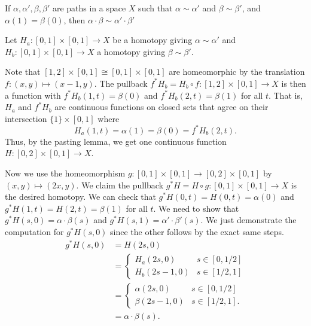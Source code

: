 \documentclass[12 pt, letterpaper]{hmcpset}
\begin{document}
\pagebreak

\begin{problem}[12.5]
	If $\alpha, \alpha', \beta, \beta'$ are paths in a space $X$ such that $\alpha \sim \alpha'$ and $\beta \sim \beta'$, and $\alpha(1) = \beta(0)$, then $\alpha \cdot \beta \sim \alpha' \cdot \beta'$
\end{problem}

\begin{solution}
	Let $H_{a} : [0, 1] \times [0, 1] \to X$ be a homotopy giving $\alpha \sim \alpha'$ and $H_{b} : [0, 1] \times [0, 1] \to X$ a homotopy giving $\beta \sim \beta'$.

	Note that $[1, 2] \times [0, 1] \cong [0, 1] \times [0, 1]$ are homeomorphic by the translation $f : (x, y) \mapsto (x - 1, y)$. The pullback $f^{*}H_{b} = H_{b} \circ f : [1, 2] \times [0, 1] \to X$ is then a function with $f^{*} H_{b}(1, t) = \beta(0)$ and $f^{*} H_{b}(2, t) = \beta(1)$ for all $t$. That is, $H_{a}$ and $f^{*} H_{b}$ are continuous functions on closed sets that agree on their intersection $\{ 1 \} \times [0, 1]$ where
	\[
		H_{a}(1, t) = \alpha(1) = \beta(0) = f^{*} H_{b}(2, t).
	\]
	Thus, by the pasting lemma, we get one continuous function $H : [0, 2] \times [0, 1] \to X$.

	Now we use the homeomorphism $g : [0, 1] \times [0, 1] \to [0, 2] \times [0, 1]$ by $(x, y) \mapsto (2x, y)$. We claim the pullback $g^{*} H = H \circ g : [0, 1] \times [0, 1] \to X$ is the desired homotopy. We can check that $g^{*}H(0, t) = H(0, t) = \alpha(0)$ and $g^{*}H(1, t) = H(2, t) = \beta(1)$ for all $t$. We need to show that $g^{*} H(s, 0) = \alpha \cdot \beta(s)$ and $g^{*}H(s, 1) = \alpha' \cdot \beta'(s)$. We just demonstrate the computation for $g^{*}H(s, 0)$ since the other follows by the exact same steps.
	\begin{align*}
		g^{*} H(s, 0) & = H(2s, 0) \\
			      & = \begin{cases}
			H_{a}(2s, 0) & s \in [0, 1/2] \\
			H_{b}(2s - 1, 0) & s \in [1/2, 1]
		\end{cases} \\
			      & = \begin{cases}
				      \alpha(2s, 0) & s \in [0, 1/2] \\
				      \beta(2s - 1, 0) & s \in [1/2, 1].
			      \end{cases} \\
			      & = \alpha \cdot \beta(s).
	\end{align*}
\end{solution}
\end{document}
